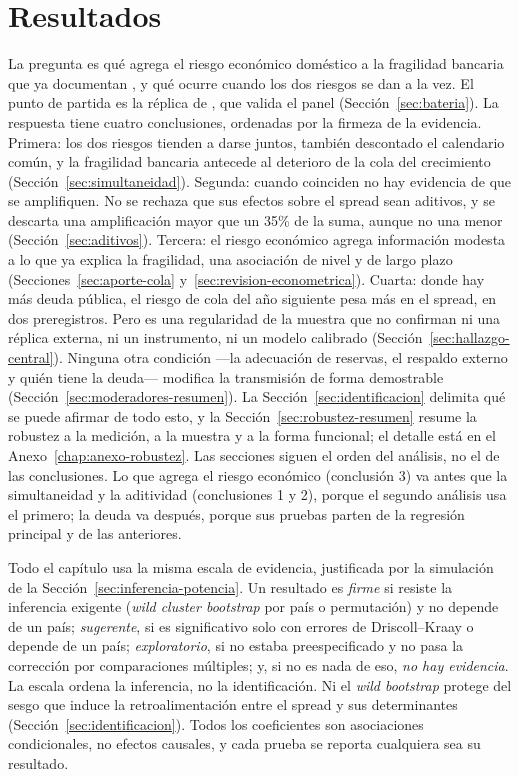\chapter{Resultados}
\label{sec:resultados}

La pregunta es qué agrega el riesgo económico doméstico a la fragilidad bancaria que ya documentan \citet{Chari2024b}, y qué ocurre cuando los dos riesgos se dan a la vez. El punto de partida es la réplica de \citet{Chari2024b}, que valida el panel (Sección~\ref{sec:bateria}). La respuesta tiene cuatro conclusiones, ordenadas por la firmeza de la evidencia. Primera: los dos riesgos tienden a darse juntos, también descontado el calendario común, y la fragilidad bancaria antecede al deterioro de la cola del crecimiento (Sección~\ref{sec:simultaneidad}). Segunda: cuando coinciden no hay evidencia de que se amplifiquen. No se rechaza que sus efectos sobre el spread sean aditivos, y se descarta una amplificación mayor que un 35\% de la suma, aunque no una menor (Sección~\ref{sec:aditivos}). Tercera: el riesgo económico agrega información modesta a lo que ya explica la fragilidad, una asociación de nivel y de largo plazo (Secciones~\ref{sec:aporte-cola} y~\ref{sec:revision-econometrica}). Cuarta: donde hay más deuda pública, el riesgo de cola del año siguiente pesa más en el spread, en dos preregistros. Pero es una regularidad de la muestra que no confirman ni una réplica externa, ni un instrumento, ni un modelo calibrado (Sección~\ref{sec:hallazgo-central}). Ninguna otra condición ---la adecuación de reservas, el respaldo externo y quién tiene la deuda--- modifica la transmisión de forma demostrable (Sección~\ref{sec:moderadores-resumen}). La Sección~\ref{sec:identificacion} delimita qué se puede afirmar de todo esto, y la Sección~\ref{sec:robustez-resumen} resume la robustez a la medición, a la muestra y a la forma funcional; el detalle está en el Anexo~\ref{chap:anexo-robustez}. Las secciones siguen el orden del análisis, no el de las conclusiones. Lo que agrega el riesgo económico (conclusión 3) va antes que la simultaneidad y la aditividad (conclusiones 1 y 2), porque el segundo análisis usa el primero; la deuda va después, porque sus pruebas parten de la regresión principal y de las anteriores.

Todo el capítulo usa la misma escala de evidencia, justificada por la simulación de la Sección~\ref{sec:inferencia-potencia}. Un resultado es \emph{firme} si resiste la inferencia exigente (\textit{wild cluster bootstrap} por país o permutación) y no depende de un país; \emph{sugerente}, si es significativo solo con errores de Driscoll--Kraay o depende de un país; \emph{exploratorio}, si no estaba preespecificado y no pasa la corrección por comparaciones múltiples; y, si no es nada de eso, \emph{no hay evidencia}. La escala ordena la inferencia, no la identificación. Ni el \textit{wild bootstrap} protege del sesgo que induce la retroalimentación entre el spread y sus determinantes (Sección~\ref{sec:identificacion}). Todos los coeficientes son asociaciones condicionales, no efectos causales, y cada prueba se reporta cualquiera sea su resultado.

